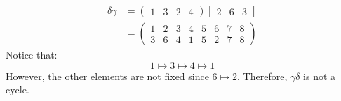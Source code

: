 \begin{itemize}
\begin{example}
\begin{align}
                \delta \gamma &= \begin{pmatrix}
                    1&3&2&4
                \end{pmatrix}\begin{bmatrix}
                    2&6&3
                \end{bmatrix} \\ 
                &= \begin{pmatrix}
                    1&2&3&4&5&6&7&8 \\ 
                    3&6&4&1&5&2&7&8
                \end{pmatrix}
            \end{align}
            Notice that:
            \begin{equation}
                1\mapsto 3\mapsto 4 \mapsto 1
            \end{equation}
            However, the other elements are not fixed since $6\mapsto 2$. Therefore, $\gamma\delta$ is not a cycle.
        \end{example}
\end{itemize}